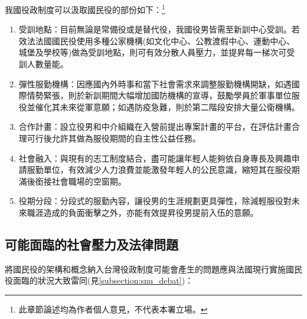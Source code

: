 \documentclass[a4paper,14pt]{extarticle}
\theoremstyle{plain}
\theoremstyle{remark}
\numberwithin{equation}{section}
\begin{document}
\par 

我國役政制度可以汲取國民役的部份如下：\footnote{此章節論述均為作者個人意見，不代表本署立場。}

\begin{enumerate}
  \item 受訓地點：目前無論是常備役或是替代役，我國役男皆需至新訓中心受訓。若效法法國國民役使用多種公家機構(如文化中心、公教渡假中心、運動中心、城堡及學校等)做為受訓地點，則可有效分散人員壓力，並提昇每一梯次可受訓人數量能。
  \item 彈性服勤機構：因應國內外時事和當下社會需求來調整服勤機構開缺，如遇國際情勢緊張，則於新訓期間大幅增加國防機構的宣導，鼓勵學員於軍事單位服役並催化其未來從軍意願；如遇防疫急難，則於第二階段安排大量公衛機構。
  \item 合作計畫：設立役男和中介組織在入營前提出專案計畫的平台，在評估計畫合理可行後允許其做為服役期間的自主性公益任務。
  \item 社會融入：與現有的志工制度結合，盡可能讓年輕人能夠依自身專長及興趣申請服勤單位，有效減少人力浪費並能激發年輕人的公民意識，縮短其在服役期滿後銜接社會職場的空窗期。
  \item 役期分段：分段式的服勤內容，讓役男的生涯規劃更具彈性，除減輕服役對未來職涯造成的負面衝擊之外，亦能有效提昇役男提前入伍的意願。
\end{enumerate}



\subsection{可能面臨的社會壓力及法律問題}

將國民役的架構和概念納入台灣役政制度可能會產生的問題應與法國現行實施國民役面臨的狀況大致雷同(見\ref{subsection:snu_debat})：
\end{document}
